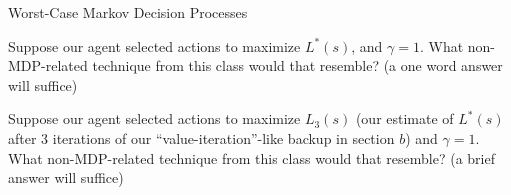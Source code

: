 \begin{problem}[]{Worst-Case Markov Decision Processes}
\begin{question}[5]
\end{question}
\vspace{-0.3cm}
\begin{question}[2]
Suppose our agent selected actions to maximize $L^*(s)$, and $\gamma = 1$. What non-MDP-related technique from this class would that resemble? (a one word answer will suffice)

\vspace{-0.1cm}
\vspace{-0.1cm}

\end{question}

\vspace{-0.2cm}
\begin{question}[2]
Suppose our agent selected actions to maximize $L_3(s)$ (our estimate of $L^*(s)$ after 3 iterations of our ``value-iteration''-like backup in section $b$) and $\gamma = 1$. What non-MDP-related technique from this class would that resemble? (a brief answer will suffice) \\
\vspace{-0.1cm}
\end{question}
\end{problem}